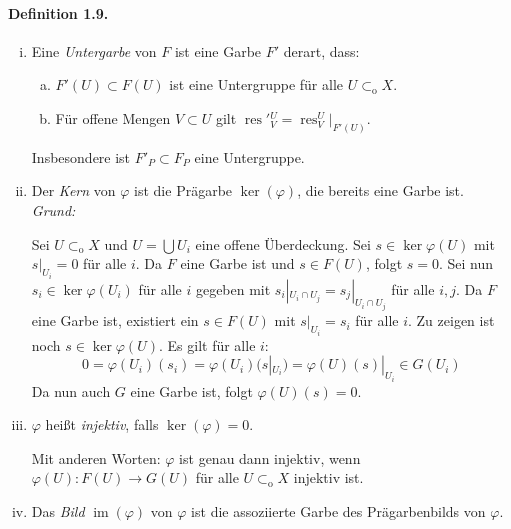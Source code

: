 \documentclass[11pt,b5paper,openany]{memoir}
\begin{document}
\paragraph{Definition 1.9.}\label{1.9} 
\begin{enumerate}[(i)]
\item Eine \textit{Untergarbe} von $F$ ist eine Garbe $F'$ derart, dass:
\begin{enumerate}[(a)]
\item $F'(U)\subset F(U)$ ist eine Untergruppe für alle $U\subset_\text{o}X$.
\item Für offene Mengen $V\subset U$ gilt $\operatorname{res}'{}^U_V=\operatorname{res}^U_V|_{F'(U)}$.
\end{enumerate}
Insbesondere ist $F'_P\subset F_P$ eine Untergruppe.
\item Der \textit{Kern} von $\varphi$ ist die Prägarbe $\ker(\varphi)$, die bereits eine Garbe ist. \textit{Grund:}

Sei $U\subset_\text{o}X$ und $U=\bigcup U_i$ eine offene Überdeckung. Sei $s\in\ker\varphi(U)$ mit $s|_{U_i}=0$ für alle $i$. Da $F$ eine Garbe ist und $s\in F(U)$, folgt $s=0$. Sei nun $s_i\in \ker\varphi(U_i)$ für alle $i$ gegeben mit $s_i|_{U_i\cap U_j}=s_j|_{U_i\cap U_j}$ für alle $i,j$. Da $F$ eine Garbe ist, existiert ein $s\in F(U)$ mit $s|_{U_i}=s_i$ für alle $i$. Zu zeigen ist noch $s\in \ker\varphi(U)$. Es gilt für alle $i$:
\[0=\varphi(U_i)(s_i)=\varphi(U_i)(s|_{U_i}) = \varphi(U)(s)|_{U_i}\in G(U_i) \]
Da nun auch $G$ eine Garbe ist, folgt $\varphi(U)(s)=0$.
\item $\varphi$ heißt \textit{injektiv}, falls $\ker(\varphi)=0$. 

Mit anderen Worten: $\varphi$ ist genau dann injektiv, wenn $\varphi(U):F(U)\to G(U)$ für alle $U\subset_\text{o}X$ injektiv ist.
\item Das \textit{Bild} $\operatorname{im}(\varphi)$ von $\varphi$ ist die assoziierte Garbe des Prägarbenbilds von $\varphi$.


\end{enumerate}
\end{document}
